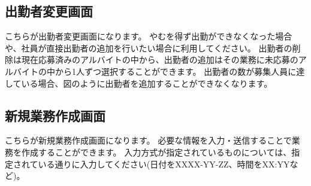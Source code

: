 \documentclass[11pt, a4paper]{jarticle}
\begin{document}
	\subsection{出勤者変更画面}
		\begin{figure}[htbp]
			\centering
		\end{figure}
		こちらが出勤者変更画面になります。
		やむを得ず出勤ができなくなった場合や、社員が直接出勤者の追加を行いたい場合に利用してください。
		出勤者の削除は現在応募済みのアルバイトの中から、出勤者の追加はその業務に未応募のアルバイトの中から1人ずつ選択することができます。
		出勤者の数が募集人員に達している場合、図のように出勤者を追加することができなくなります。


	\subsection{新規業務作成画面}
		\begin{figure}[htbp]
			\centering
		\end{figure}
		こちらが新規業務作成画面になります。
		必要な情報を入力・送信することで業務を作成することができます。
		入力方式が指定されているものについては、指定されている通りに入力してください(日付をXXXX-YY-ZZ、時間をXX:YYなど)。
		\clearpage
\end{document}
